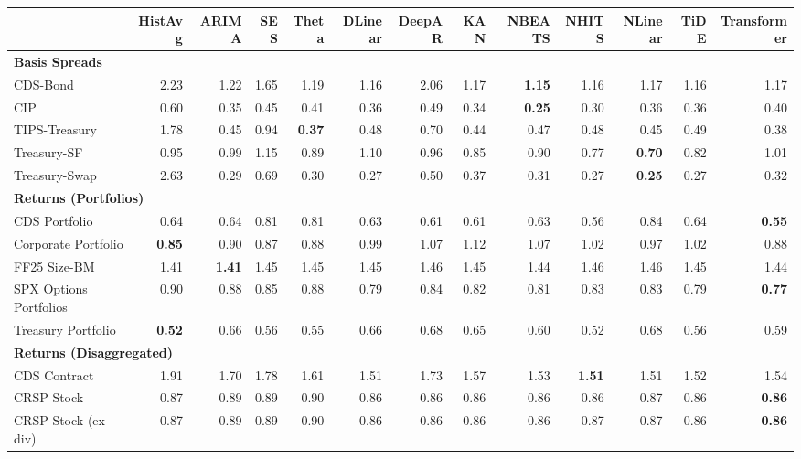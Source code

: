 \scriptsize
\setlength{\tabcolsep}{1.5pt}
\renewcommand{\arraystretch}{0.9}
\begin{tabular}{@{}lrrrrrrrrrrrr@{}}
\toprule
 & HistAvg & ARIMA & SES & Theta & DLinear & DeepAR & KAN & NBEATS & NHITS & NLinear & TiDE & Transformer \\
\midrule
\multicolumn{13}{l}{\textbf{Basis Spreads}} \\
CDS-Bond & 2.23 & 1.22 & 1.65 & 1.19 & 1.16 & 2.06 & 1.17 & \textbf{1.15} & 1.16 & 1.17 & 1.16 & 1.17 \\
CIP & 0.60 & 0.35 & 0.45 & 0.41 & 0.36 & 0.49 & 0.34 & \textbf{0.25} & 0.30 & 0.36 & 0.36 & 0.40 \\
TIPS-Treasury & 1.78 & 0.45 & 0.94 & \textbf{0.37} & 0.48 & 0.70 & 0.44 & 0.47 & 0.48 & 0.45 & 0.49 & 0.38 \\
Treasury-SF & 0.95 & 0.99 & 1.15 & 0.89 & 1.10 & 0.96 & 0.85 & 0.90 & 0.77 & \textbf{0.70} & 0.82 & 1.01 \\
Treasury-Swap & 2.63 & 0.29 & 0.69 & 0.30 & 0.27 & 0.50 & 0.37 & 0.31 & 0.27 & \textbf{0.25} & 0.27 & 0.32 \\
\midrule
\multicolumn{13}{l}{\textbf{Returns (Portfolios)}} \\
CDS Portfolio & 0.64 & 0.64 & 0.81 & 0.81 & 0.63 & 0.61 & 0.61 & 0.63 & 0.56 & 0.84 & 0.64 & \textbf{0.55} \\
Corporate Portfolio & \textbf{0.85} & 0.90 & 0.87 & 0.88 & 0.99 & 1.07 & 1.12 & 1.07 & 1.02 & 0.97 & 1.02 & 0.88 \\
FF25 Size-BM & 1.41 & \textbf{1.41} & 1.45 & 1.45 & 1.45 & 1.46 & 1.45 & 1.44 & 1.46 & 1.46 & 1.45 & 1.44 \\
SPX Options Portfolios & 0.90 & 0.88 & 0.85 & 0.88 & 0.79 & 0.84 & 0.82 & 0.81 & 0.83 & 0.83 & 0.79 & \textbf{0.77} \\
Treasury Portfolio & \textbf{0.52} & 0.66 & 0.56 & 0.55 & 0.66 & 0.68 & 0.65 & 0.60 & 0.52 & 0.68 & 0.56 & 0.59 \\
\midrule
\multicolumn{13}{l}{\textbf{Returns (Disaggregated)}} \\
CDS Contract & 1.91 & 1.70 & 1.78 & 1.61 & 1.51 & 1.73 & 1.57 & 1.53 & \textbf{1.51} & 1.51 & 1.52 & 1.54 \\
CRSP Stock & 0.87 & 0.89 & 0.89 & 0.90 & 0.86 & 0.86 & 0.86 & 0.86 & 0.86 & 0.87 & 0.86 & \textbf{0.86} \\
CRSP Stock (ex-div) & 0.87 & 0.89 & 0.89 & 0.90 & 0.86 & 0.86 & 0.86 & 0.86 & 0.87 & 0.87 & 0.86 & \textbf{0.86} \\

\end{tabular}
